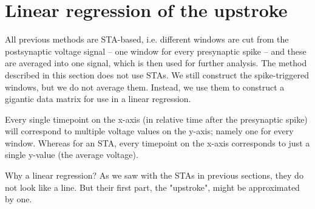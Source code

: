 
\clearpage
\section{Linear regression of the upstroke}

All previous methods are STA-based, i.e. different windows are cut from the postsynaptic voltage signal -- one window for every presynaptic spike -- and these are averaged into one signal, which is then used for further analysis. The method described in this section does not use STAs. We still construct the spike-triggered windows, but we do not average them. Instead, we use them to construct a gigantic data matrix for use in a linear regression.

Every single timepoint on the x-axis (in relative time after the presynaptic spike) will correspond to multiple voltage values on the y-axis; namely one for every window. Whereas for an STA, every timepoint on the x-axis corresponds to just a single y-value (the average voltage).

Why a linear regression? As we saw with the STAs in previous sections, they do not look like a line. But their first part, the "upstroke", might be approximated by one.

